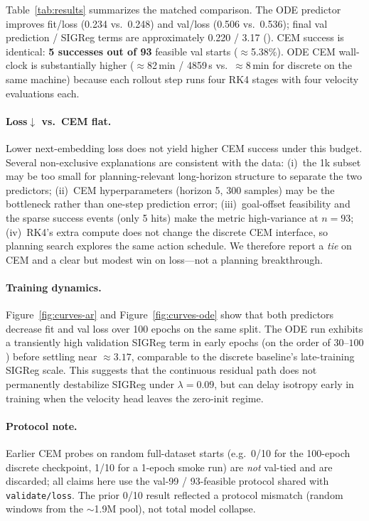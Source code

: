 Table~\ref{tab:results} summarizes the matched comparison.
The ODE predictor improves fit/loss (0.234 vs.\ 0.248) and val/loss
(0.506 vs.\ 0.536); final val prediction / SIGReg terms are
approximately 0.220 / 3.17 ().
CEM success is identical: \textbf{5 successes out of 93} feasible
val starts ($\approx$5.38\%).
ODE CEM wall-clock is substantially higher ($\approx$82\,min /
4859\,s vs.\ $\approx$8\,min for discrete on the same machine) because
each rollout step runs four RK4 stages with four velocity evaluations
each.

\paragraph{Loss$\downarrow$ vs.\ CEM flat.}
Lower next-embedding loss does not yield higher CEM success under
this budget.
Several non-exclusive explanations are consistent with the data:
(i)~the 1k subset may be too small for planning-relevant long-horizon
structure to separate the two predictors;
(ii)~CEM hyperparameters (horizon 5, 300 samples) may be the bottleneck
rather than one-step prediction error;
(iii)~goal-offset feasibility and the sparse success events (only 5
hits) make the metric high-variance at $n{=}93$;
(iv)~RK4's extra compute does not change the discrete CEM interface,
so planning search explores the same action schedule.
We therefore report a \emph{tie} on CEM and a clear but modest win on
loss---not a planning breakthrough.

\paragraph{Training dynamics.}
Figure~\ref{fig:curves-ar} and Figure~\ref{fig:curves-ode} show
that both predictors decrease fit and val loss over 100 epochs on the
same split.
The ODE run exhibits a transiently high validation SIGReg term in
early epochs (on the order of $30$--$100$) before settling near
$\approx 3.17$, comparable to the discrete baseline's late-training
SIGReg scale.
This suggests that the continuous residual path does not permanently
destabilize SIGReg under $\lambda{=}0.09$, but can delay isotropy early
in training when the velocity head leaves the zero-init regime.

\paragraph{Protocol note.}
Earlier CEM probes on random full-dataset starts (e.g.\ 0/10 for the
100-epoch discrete checkpoint, 1/10 for a 1-epoch smoke run) are
\emph{not} val-tied and are discarded; all claims here use the
val-99 / 93-feasible protocol shared with \texttt{validate/loss}.
The prior 0/10 result reflected a protocol mismatch (random windows
from the $\sim$1.9M pool), not total model collapse.

